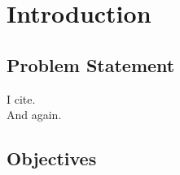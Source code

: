 \section{Introduction}
\subsection{Problem Statement}
I cite.\autocite[cf.][149]{Chang.2014}\\
And again.\autocite[4-5]{Dunser.2012}
\subsection{Objectives}